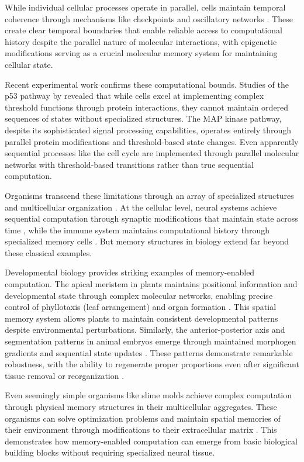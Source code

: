 \documentclass[12pt]{article}
\begin{document}
While individual cellular processes operate in parallel, cells maintain temporal coherence through mechanisms like checkpoints and oscillatory networks \cite{espinosa2024molecular}. These create clear temporal boundaries that enable reliable access to computational history despite the parallel nature of molecular interactions, with epigenetic modifications serving as a crucial molecular memory system for maintaining cellular state.

Recent experimental work confirms these computational bounds. Studies of the p53 pathway by \cite{batchelor2023dynamic} revealed that while cells excel at implementing complex threshold functions through protein interactions, they cannot maintain ordered sequences of states without specialized structures. The MAP kinase pathway, despite its sophisticated signal processing capabilities, operates entirely through parallel protein modifications and threshold-based state changes. Even apparently sequential processes like the cell cycle are implemented through parallel molecular networks with threshold-based transitions rather than true sequential computation.

Organisms transcend these limitations through an array of specialized structures and multicellular organization \cite{espinosa2024molecular}. At the cellular level, neural systems achieve sequential computation through synaptic modifications that maintain state across time \cite{fu2024memory}, while the immune system maintains computational history through specialized memory cells \cite{niu2022computational}. But memory structures in biology extend far beyond these classical examples.

Developmental biology provides striking examples of memory-enabled computation. The apical meristem in plants maintains positional information and developmental state through complex molecular networks, enabling precise control of phyllotaxis (leaf arrangement) and organ formation \cite{lovkvist2021using}. This spatial memory system allows plants to maintain consistent developmental patterns despite environmental perturbations. Similarly, the anterior-posterior axis and segmentation patterns in animal embryos emerge through maintained morphogen gradients and sequential state updates \cite{pastor2020computation}. These patterns demonstrate remarkable robustness, with the ability to regenerate proper proportions even after significant tissue removal or reorganization \cite{lobo2012towards}.

Even seemingly simple organisms like slime molds achieve complex computation through physical memory structures in their multicellular aggregates. These organisms can solve optimization problems and maintain spatial memories of their environment through modifications to their extracellular matrix \cite{hoel2020emergence}. This demonstrates how memory-enabled computation can emerge from basic biological building blocks without requiring specialized neural tissue.
\end{document}
